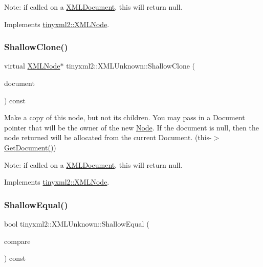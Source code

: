 Note\+: if called on a \hyperlink{classtinyxml2_1_1XMLDocument}{X\+M\+L\+Document}, this will return null. 

Implements \hyperlink{classtinyxml2_1_1XMLNode_a8402cbd3129d20e9e6024bbcc0531283}{tinyxml2\+::\+X\+M\+L\+Node}.

\mbox{\label{classtinyxml2_1_1XMLUnknown_a0125f41c89763dea06619b5fd5246b4c}} 
\subsubsection{\texorpdfstring{Shallow\+Clone()}{ShallowClone()}\hspace{0.1cm}{\footnotesize\ttfamily [2/2]}}
{\footnotesize\ttfamily virtual \hyperlink{classtinyxml2_1_1XMLNode}{X\+M\+L\+Node}$\ast$ tinyxml2\+::\+X\+M\+L\+Unknown\+::\+Shallow\+Clone (\begin{DoxyParamCaption}\item[{\hyperlink{classtinyxml2_1_1XMLDocument}{X\+M\+L\+Document} $\ast$}]{document }\end{DoxyParamCaption}) const\hspace{0.3cm}{\ttfamily [virtual]}}

Make a copy of this node, but not its children. You may pass in a Document pointer that will be the owner of the new \hyperlink{classNode}{Node}. If the \textquotesingle{}document\textquotesingle{} is null, then the node returned will be allocated from the current Document. (this-\/$>$\hyperlink{classtinyxml2_1_1XMLNode_af343d1ef0b45c0020e62d784d7e67a68}{Get\+Document()})

Note\+: if called on a \hyperlink{classtinyxml2_1_1XMLDocument}{X\+M\+L\+Document}, this will return null. 

Implements \hyperlink{classtinyxml2_1_1XMLNode_a8402cbd3129d20e9e6024bbcc0531283}{tinyxml2\+::\+X\+M\+L\+Node}.

\mbox{\label{classtinyxml2_1_1XMLUnknown_ac46767cd721d666e690a6231dfb618d1}} 
\subsubsection{\texorpdfstring{Shallow\+Equal()}{ShallowEqual()}\hspace{0.1cm}{\footnotesize\ttfamily [1/2]}}
{\footnotesize\ttfamily bool tinyxml2\+::\+X\+M\+L\+Unknown\+::\+Shallow\+Equal (\begin{DoxyParamCaption}\item[{const \hyperlink{classtinyxml2_1_1XMLNode}{X\+M\+L\+Node} $\ast$}]{compare }\end{DoxyParamCaption}) const\hspace{0.3cm}{\ttfamily [virtual]}}

